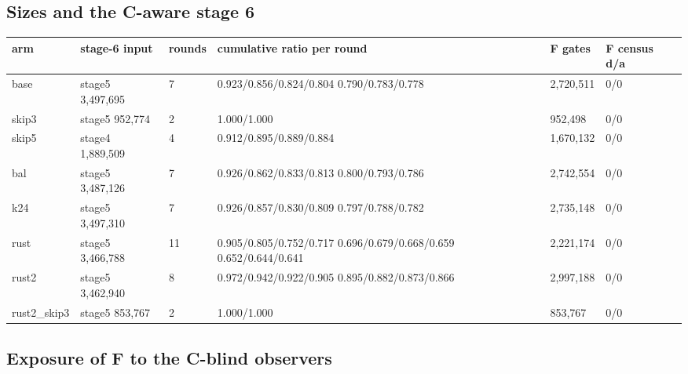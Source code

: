 \documentclass[10pt,a4paper]{article}
\begin{document}
\subsection{Sizes and the C-aware stage 6}

{\small\setlength{\tabcolsep}{2pt}\begin{longtable}{|p{1.96cm}|p{2.46cm}|p{1.37cm}|p{5.7cm}|p{1.74cm}|p{2.07cm}|}\hline
\textbf{arm} & \textbf{stage-6 input} & \textbf{rounds} & \textbf{cumulative ratio per round} & \textbf{F gates} & \textbf{F census d/\allowbreak{}a}\\\hline\endhead
base & stage5 3,497,695 & 7 & 0.923/\allowbreak{}0.856/\allowbreak{}0.824/\allowbreak{}0.804 0.790/\allowbreak{}0.783/\allowbreak{}0.778 & 2,720,511 & 0/\allowbreak{}0\\\hline
skip3 & stage5 952,774 & 2 & 1.000/\allowbreak{}1.000 & 952,498 & 0/\allowbreak{}0\\\hline
skip5 & stage4 1,889,509 & 4 & 0.912/\allowbreak{}0.895/\allowbreak{}0.889/\allowbreak{}0.884 & 1,670,132 & 0/\allowbreak{}0\\\hline
bal & stage5 3,487,126 & 7 & 0.926/\allowbreak{}0.862/\allowbreak{}0.833/\allowbreak{}0.813 0.800/\allowbreak{}0.793/\allowbreak{}0.786 & 2,742,554 & 0/\allowbreak{}0\\\hline
k24 & stage5 3,497,310 & 7 & 0.926/\allowbreak{}0.857/\allowbreak{}0.830/\allowbreak{}0.809 0.797/\allowbreak{}0.788/\allowbreak{}0.782 & 2,735,148 & 0/\allowbreak{}0\\\hline
rust & stage5 3,466,788 & 11 & 0.905/\allowbreak{}0.805/\allowbreak{}0.752/\allowbreak{}0.717 0.696/\allowbreak{}0.679/\allowbreak{}0.668/\allowbreak{}0.659 0.652/\allowbreak{}0.644/\allowbreak{}0.641 & 2,221,174 & 0/\allowbreak{}0\\\hline
rust2 & stage5 3,462,940 & 8 & 0.972/\allowbreak{}0.942/\allowbreak{}0.922/\allowbreak{}0.905 0.895/\allowbreak{}0.882/\allowbreak{}0.873/\allowbreak{}0.866 & 2,997,188 & 0/\allowbreak{}0\\\hline
rust2\_skip3 & stage5 853,767 & 2 & 1.000/\allowbreak{}1.000 & 853,767 & 0/\allowbreak{}0\\\hline
\end{longtable}}

\subsection{Exposure of F to the C-blind observers}
\end{document}
